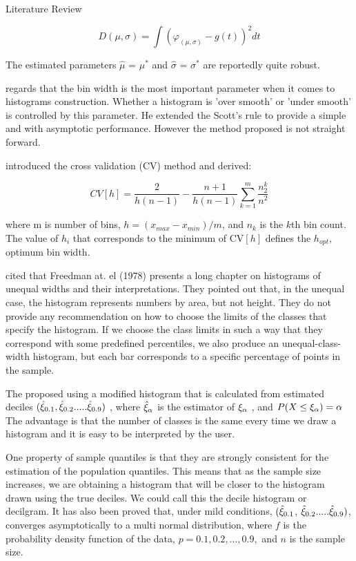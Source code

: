 \documentclass{beamer}
\begin{document}
\begin{frame}[allowframebreaks]{Literature Review}
\begin{itemize}
\begin{equation}
D(\mu,\sigma) = \int (  \varphi_{(\mu,\sigma)} - g(t)         )^2 dt
\end{equation}

The estimated parameters $\hat{\mu}$ = $\mu^*$ and $\hat{\sigma}$ = $\sigma^*$ are reportedly quite robust.

\cite{Wand1997} regards that the bin width is the most important parameter when it comes to histograms construction. Whether a histogram is 'over smooth' or 'under smooth' is controlled by this parameter. He extended the Scott's rule to provide a simple and with asymptotic performance. However the method proposed is not straight  forward.

\cite{Bura2009} introduced the cross validation (CV) method and derived:

\begin{equation}
CV\left[h\right] = \frac{2}{h(n-1)} - \frac{n+1}{h(n-1)} \sum_{k=1}^{m}\frac{n_{2}^{k}}{n^2}
\end{equation}

where m is number of bins, $h=(x_{max} - x_{min})/m$, and $n_k$ is the $k$th bin count. The value of $h_i$ that corresponds to the minimum of CV$\left[h\right]$ defines the $h_{opt}$, optimum bin width.

\cite{CorreaM2010} cited that Freedman at. el (1978) presents a long chapter on histograms of unequal widths and their interpretations. They pointed out that, in the unequal case, the histogram represents numbers by area, but not height. They do not provide any recommendation on how to choose the limits of the classes that specify the histogram. If we choose the class limits in such a way that they correspond with some predefined percentiles, we also produce an unequal-class-width histogram, but each bar corresponds to a specific percentage of points in the sample.

The proposed using a modified histogram that is calculated from estimated deciles $ ( {\hat\xi_{\small0.1}}, {\hat\xi_{\small0.2}}.....{\hat\xi_{0.9}})$ , where  $ {\hat\xi_{\small \alpha}}$ is the estimator of  $ {\xi_{\small \alpha}}$ , and  $P (X \leq {\xi_{\small \alpha}} ) = \large{ \alpha} $ The advantage is that the number of classes is the same every time we draw a histogram and it is easy to be interpreted by the user.

One property of sample quantiles is that they are strongly consistent for the estimation of the population quantiles. This means that as the sample size increases, we are obtaining a histogram that will be closer to the histogram drawn using the true deciles. We could call this the decile histogram or decilgram. It has also been proved that,	under	mild	conditions,  $ ( {\hat\xi_{\small0.1}}$,  ${\hat\xi_{\small0.2}}.....{\hat\xi_{0.9}})$, converges	asymptotically	to	a	multi normal distribution, where $f$ is the probability density function of the data, $p=0.1, 0.2,...,0.9,$ and $n$ is the sample size.



\end{itemize}
\end{frame}
\end{document}

